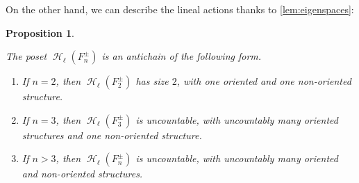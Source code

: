 \documentclass[reqno,12pt]{amsart}\setcounter{tocdepth}{1}
\newtheorem{proposition}[theorem]{Proposition}
\theoremstyle{definition}
\DeclareMathOperator{\Hyp}{\mathcal{H}}
\numberwithin{equation}{section}
\begin{document}
On the other hand, we can describe the lineal actions thanks to \cref{lem:eigenspaces}:

\begin{proposition}
\label{prop:reversing:lineal}

The poset $\Hyp_\ell(F_n^\pm)$ is an antichain of the following form.
\begin{enumerate}
\item If $n = 2$, then $\Hyp_\ell(F_2^\pm)$ has size $2$, with one oriented and one non-oriented structure.
\item If $n = 3$, then $\Hyp_\ell(F_3^\pm)$ is uncountable, with uncountably many oriented structures and one non-oriented structure.
\item If $n > 3$, then $\Hyp_\ell(F_n^\pm)$ is uncountable, with uncountably many oriented and non-oriented structures.
\end{enumerate}
\end{proposition}
\end{document}
